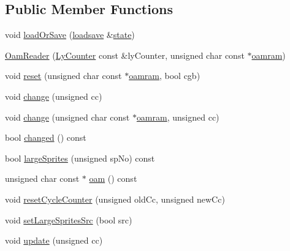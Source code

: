 \subsection*{Public Member Functions}
\begin{DoxyCompactItemize}
\item 
void \hyperlink{classgambatte_1_1SpriteMapper_1_1OamReader_a4c2aae2820fbaa3fb2d14c85f7ceb8de}{load\+Or\+Save} (\hyperlink{classgambatte_1_1loadsave}{loadsave} \&\hyperlink{ppu_8cpp_a2f2eca6997ee7baf8901725ae074d45b}{state})
\item 
\hyperlink{classgambatte_1_1SpriteMapper_1_1OamReader_ab65ab121f0685f5ef664a01bef316dbe}{Oam\+Reader} (\hyperlink{classgambatte_1_1LyCounter}{Ly\+Counter} const \&ly\+Counter, unsigned char const $\ast$\hyperlink{classgambatte_1_1SpriteMapper_a558ee1ff5817b79285f7cc91d627535b}{oamram})
\item 
void \hyperlink{classgambatte_1_1SpriteMapper_1_1OamReader_a2a361f2224f240eef6db7147fffbdcad}{reset} (unsigned char const $\ast$\hyperlink{classgambatte_1_1SpriteMapper_a558ee1ff5817b79285f7cc91d627535b}{oamram}, bool cgb)
\item 
void \hyperlink{classgambatte_1_1SpriteMapper_1_1OamReader_a94194013dbb68d7b9fee10f999f80bfe}{change} (unsigned cc)
\item 
void \hyperlink{classgambatte_1_1SpriteMapper_1_1OamReader_a47d768d577cc3f3a0c4c28224242f487}{change} (unsigned char const $\ast$\hyperlink{classgambatte_1_1SpriteMapper_a558ee1ff5817b79285f7cc91d627535b}{oamram}, unsigned cc)
\item 
bool \hyperlink{classgambatte_1_1SpriteMapper_1_1OamReader_a5b23ae57f747ce78786621a118695359}{changed} () const
\item 
bool \hyperlink{classgambatte_1_1SpriteMapper_1_1OamReader_aa00071e80166eda7afe79d9215f1085f}{large\+Sprites} (unsigned sp\+No) const
\item 
unsigned char const  $\ast$ \hyperlink{classgambatte_1_1SpriteMapper_1_1OamReader_a9b665fd4fef3a720ea2c859b1ebe0c63}{oam} () const
\item 
void \hyperlink{classgambatte_1_1SpriteMapper_1_1OamReader_a7b4142f1bec0aa8f2e30198724628d62}{reset\+Cycle\+Counter} (unsigned old\+Cc, unsigned new\+Cc)
\item 
void \hyperlink{classgambatte_1_1SpriteMapper_1_1OamReader_aca75b2d751e52e1f234da3d97cb17f8f}{set\+Large\+Sprites\+Src} (bool src)
\item 
void \hyperlink{classgambatte_1_1SpriteMapper_1_1OamReader_aed95204d144dd7d7f2cc885bf439991d}{update} (unsigned cc)

\end{DoxyCompactItemize}
